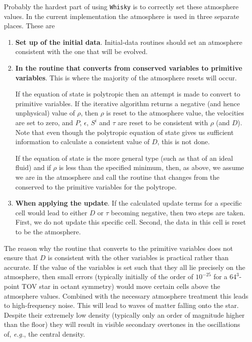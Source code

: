 \documentclass{article}
\begin{document}
Probably the hardest part of using {\tt Whisky} is to correctly set these
atmosphere values. In the current implementation the atmosphere is
used in three separate places. These are
\begin{enumerate}
\item {\bf Set up of the initial data}. Initial-data routines should set an atmosphere consistent
  with the one that will be evolved.
\item {\bf In the routine that converts from conserved variables to
    primitive variables}. This is where the majority of the atmosphere
  resets will occur. 

  If the equation of state is polytropic then an
  attempt is made to convert to primitive variables. If the iterative
  algorithm returns a negative (and hence unphysical) value of $\rho$,
  then $\rho$ is reset to the atmosphere value, the velocities are set
  to zero, and $P$, $\epsilon$, $S^i$ and $\tau$ are reset to be
  consistent with $\rho$ (and $D$). Note that even though the
  polytropic equation of state gives us sufficient information to
  calculate a consistent value of $D$, this is not done.

  If the equation of state is the more general type (such as that of an ideal fluid) and if $\rho$
  is less than the specified minimum, then, as above, we assume we are in the atmosphere and call
  the routine that changes from the conserved to the primitive variables for the polytrope.

\item {\bf When applying the update}. If the calculated update terms
  for a specific cell would lead to either $D$ or $\tau$ becoming
  negative, then two steps are taken. First, we do not update this
  specific cell. Second, the data in this cell is reset to be the
  atmosphere. 
\end{enumerate}

The reason why the routine that converts to the primitive variables
does not ensure that $D$ is consistent with the other variables is
practical rather than accurate. If the value of the variables is set
such that they all lie precisely on the atmosphere, then small errors
(typically initially of the order of $10^{-25}$ for a $64^3$-point TOV star
in octant symmetry) would move certain cells above the atmosphere
values. Combined with the necessary atmosphere treatment this leads to
high-frequency noise. This will lead to waves of matter falling onto
the star. Despite their extremely low density (typically only an
order of magnitude higher than the floor) they will result in visible
secondary overtones in the oscillations of, {\it e.g.}, the central
density. 
\end{document}
